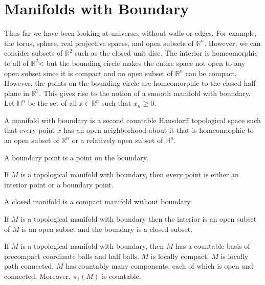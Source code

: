 \documentclass{article}                                                        %
\begin{document}
    \section{Manifolds with Boundary}
        Thus far we have been looking at universes without walls or edges. For
        example, the torus, sphere, real projective spaces, and open subsets of
        $\mathbb{R}^{n}$. However, we can consider subsets of $\mathbb{R}^{2}$
        such as the closed unit disc. The interior is homeomorphic to all of
        $\mathbb{R}^{2}$< but the bounding circle makes the entire space not
        open to any open subset since it is compact and no open subset of
        $\mathbb{R}^{n}$ can be compact. However, the points on the bounding
        circle are homeomorphic to the closed half plane in $\mathbb{R}^{2}$.
        This gives rise to the notion of a smooth manifold with boundary.
        Let $\mathbb{H}^{n}$ be the set of all $\mathbb{x}\in\mathbb{R}^{n}$
        such that $x_{n}\geq{0}$.
        \begin{definition}
            A manifold with boundary is a second countable Hausdorff topological
            space such that every point $x$ has an open neighborhood about it
            that is homeomorphic to an open subset of $\mathbb{R}^{n}$ or a
            relatively open subset of $\mathbb{H}^{n}$.
        \end{definition}
        \begin{definition}
            A boundary point is a point on the boundary.
        \end{definition}
        \begin{theorem}
            If $M$ is a topological manifold with boundary, then every point is
            either an interior point or a boundary point.
        \end{theorem}
        \begin{definition}
            A closed manifold is a compact manifold without boundary.
        \end{definition}
        \begin{theorem}
            If $M$ is a topological manifold with boundary then the interior is
            an open subset of $M$ is an open subset and the boundary is a
            closed subset.
        \end{theorem}
        \begin{theorem}
            If $M$ is a topological manifold with boundary, then $M$ has a
            countable basis of precompact coordinate balls and half balls.
            $M$ is locally compact. $M$ is locally path connected. $M$ has
            countably many components, each of which is open and connected.
            Moreover, $\pi_{1}(M)$ is countable.
        \end{theorem}
\end{document}
